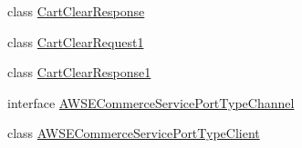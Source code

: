 \begin{DoxyCompactItemize}
class \hyperlink{class_amazon___price___finder_1_1amazon_1_1ecs_1_1_cart_clear_response}{Cart\-Clear\-Response}
\begin{DoxyCompactList}\small\item\em \end{DoxyCompactList}\item 
class \hyperlink{class_amazon___price___finder_1_1amazon_1_1ecs_1_1_cart_clear_request1}{Cart\-Clear\-Request1}
\item 
class \hyperlink{class_amazon___price___finder_1_1amazon_1_1ecs_1_1_cart_clear_response1}{Cart\-Clear\-Response1}
\item 
interface \hyperlink{interface_amazon___price___finder_1_1amazon_1_1ecs_1_1_a_w_s_e_commerce_service_port_type_channel}{A\-W\-S\-E\-Commerce\-Service\-Port\-Type\-Channel}
\item 
class \hyperlink{class_amazon___price___finder_1_1amazon_1_1ecs_1_1_a_w_s_e_commerce_service_port_type_client}{A\-W\-S\-E\-Commerce\-Service\-Port\-Type\-Client}
\end{DoxyCompactItemize}
